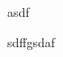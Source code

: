 \documentclass[
	final,
	a4paper,
	oneside,
	parskip=full,
	headings=standardclasses,
	headings=big,
	pointednumbers,
    fleqn
]{scrartcl}
\begin{document}
    \newpage
    

    asdf

    sdffgsdaf
\end{document}
